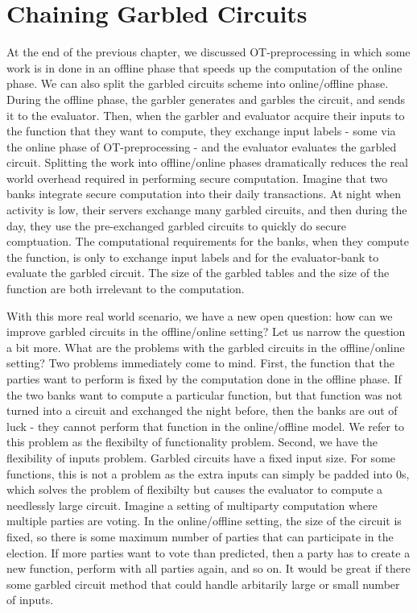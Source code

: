 \chapter{Chaining Garbled Circuits}

At the end of the previous chapter, we discussed OT-preprocessing in which some work is in done in an offline phase that speeds up the computation of the online phase.
We can also split the garbled circuits scheme into online/offline phase.
During the offline phase, the garbler generates and garbles the circuit, and sends it to the evaluator.
Then, when the garbler and evaluator acquire their inputs to the function that they want to compute, they exchange input labels - some via the online phase of OT-preprocessing - and the evaluator evaluates the garbled circuit.
Splitting the work into offline/online phases dramatically reduces the real world overhead required in performing secure computation.
Imagine that two banks integrate secure computation into their daily transactions.
At night when activity is low, their servers exchange many garbled circuits, and then during the day, they use the pre-exchanged garbled circuits to quickly do secure comptuation.
The computational requirements for the banks, when they compute the function, is only to exchange input labels and for the evaluator-bank to evaluate the garbled circuit.
The size of the garbled tables and the size of the function are both irrelevant to the computation.

With this more real world scenario, we have a new open question: how can we improve garbled circuits in the offline/online setting?
Let us narrow the question a bit more.
What are the problems with the garbled circuits in the offline/online setting?
Two problems immediately come to mind. 
First, the function that the parties want to perform is fixed by the computation done in the offline phase.
If the two banks want to compute a particular function, but that function was not turned into a circuit and exchanged the night before, then the banks are out of luck - they cannot perform that function in the online/offline model.
We refer to this problem as the flexibilty of functionality problem.
Second, we have the flexibility of inputs problem.
Garbled circuits have a fixed input size.
For some functions, this is not a problem as the extra inputs can simply be padded into $0$s, which solves the problem of flexibilty but causes the evaluator to compute a needlessly large circuit.
Imagine a setting of multiparty computation where multiple parties are voting.
In the online/offline setting, the size of the circuit is fixed, so there is some maximum number of parties that can participate in the election.
If more parties want to vote than predicted, then a party has to create a new function, perform with all parties again, and so on.
It would be great if there some garbled circuit method that could handle arbitarily large or small number of inputs.

